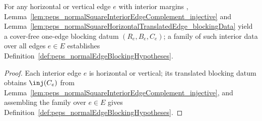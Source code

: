 \begin{lemma}%
    \label{lem:peps_normalSquareInteriorEdgeBlocking}
    \leanok
    For any horizontal or vertical edge $e$ with interior margins
    \cite{gap:peps_normal_ft_section3_route},
    Lemma~\ref{lem:peps_normalSquareInteriorEdgeComplement_injective} and
    Lemma~\ref{lem:peps_normalSquareHorizontalTranslatedEdge_blockingData}
    yield a cover-free one-edge blocking datum $(R_e,B_e,C_e)$; a family of
    such interior data over all edges $e\in E$ establishes
    Definition~\ref{def:peps_normalEdgeBlockingHypotheses}.
\end{lemma}
\begin{proof}\leanok
    Each interior edge $e$ is horizontal or vertical; its translated blocking
    datum obtains $\inj(C_e)$ from
    Lemma~\ref{lem:peps_normalSquareInteriorEdgeComplement_injective}, and
    assembling the family over $e\in E$ gives
    Definition~\ref{def:peps_normalEdgeBlockingHypotheses}.
\end{proof}

